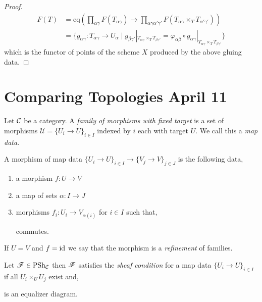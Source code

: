 \documentclass[12pt]{article}
\begin{document}
\begin{proof}
\begin{align*}
F(T) &= \mathrm{eq}{\left( \prod_{\alpha \gamma} F(T_{\alpha \gamma}) \to \prod_{\alpha \gamma \alpha' \gamma'} F(T_{\alpha \gamma} \times_T T_{\alpha' \gamma'}) \right)} 
\\
& = \{ g_{\alpha \gamma} : T_{\alpha \gamma} \to U_\alpha \mid g_{\beta \gamma'} |_{T_{\alpha \gamma} \times_T T_{\beta \gamma'}} = \varphi_{\alpha \beta} \circ g_{\alpha \gamma}  |_{T_{\alpha \gamma} \times_T T_{\beta \gamma'}} \} 
\end{align*}
which is the functor of points of the scheme $X$ produced by the above gluing data.
\end{proof}

\section{Comparing Topologies April 11}

\begin{defn}
Let $\mathcal{C}$ be a category. A \textit{family of morphisms with fixed target} is a set of morphisms $\mathcal{U} = \{ U_i \to U \}_{i \in I}$ indexed by $i$ each with target $U$. We call this a \textit{map data}.
\end{defn}

\begin{defn}
A morphism of map data $\{ U_i \to U \}_{i \in I} \to \{ V_j \to V \}_{j \in J}$ is the following data,
\begin{enumerate}
\item a morphism $f : U \to V$
\item a map of sets $\alpha : I \to J$
\item morphisms $f_i : U_i \to V_{\alpha(i)}$ for $i \in I$ such that,
\begin{center}
\end{center}
commutes.
\end{enumerate}
If $U = V$ and $f = \mathrm{id}$ we say that the morphism is a \textit{refinement} of families.
\end{defn}

\begin{defn}
Let $\mathscr{F} \in \mathrm{PSh}_{\mathcal{C}}$ then $\mathscr{F}$ satisfies the \textit{sheaf condition} for a map data $\{ U_i \to U \}_{i \in I}$ if all $U_i \times_U U_j$ exist and,
\begin{center}
\end{center}
is an equalizer diagram.
\end{defn}
\end{document}
